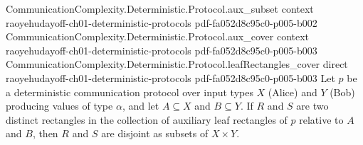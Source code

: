 \begin{lemma}
\proofstep
  {CommunicationComplexity.Deterministic.Protocol.aux_subset}
  {context}
  {raoyehudayoff-ch01-deterministic-protocols}
  {pdf-fa052d8c95c0-p005-b002}
\proofstep
  {CommunicationComplexity.Deterministic.Protocol.aux_cover}
  {context}
  {raoyehudayoff-ch01-deterministic-protocols}
  {pdf-fa052d8c95c0-p005-b003}
\proofstep
  {CommunicationComplexity.Deterministic.Protocol.leafRectangles_cover}
  {direct}
  {raoyehudayoff-ch01-deterministic-protocols}
  {pdf-fa052d8c95c0-p005-b003}
Let $p$ be a deterministic communication protocol over input types $X$ (Alice) and $Y$
(Bob) producing values of type $\alpha$, and let $A \subseteq X$ and $B \subseteq Y$. If
$R$ and $S$ are two distinct rectangles in the collection of auxiliary leaf rectangles
of $p$ relative to $A$ and $B$, then $R$ and $S$ are disjoint as subsets of $X \times
Y$.
\end{lemma}

